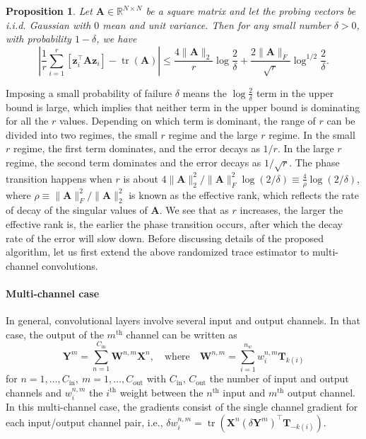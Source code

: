 \documentclass[10pt]{article}
\newcommand{\B}{\mathbf}
\newtheorem{proposition}{Proposition}
\begin{document}
\begin{proposition}
Let $\B{A} \in \mathbb{R}^{N \times N}$ be a square matrix and let the probing vectors be i.i.d. Gaussian with $0$ mean and unit variance. Then for any small number $\delta >0$, with probability $1-\delta$, we have
\[
\left| \frac{1}{r}\sum_{i=1}^r\left[\B{z}^{\top}_i \B{A} \B{z}_i\right] - \operatorname{tr}\left(\B{A}\right)\right| \leq  \frac{4\|\B{A}\|_2}{r}\log \frac{2}{\delta} + \frac{2\|\B{A}\|_F}{\sqrt r}\log^{1/2} \frac{2}{\delta}.
\]
\end{proposition}
Imposing a small probability of failure $\delta$ means the $\log\frac{2}{\delta}$ term in the upper bound is large, which implies that neither term in the upper bound is dominating for all the $r$ values. Depending on which term is dominant, the range of $r$ can be divided into two regimes, the small $r$ regime and the large $r$ regime. In the small $r$ regime, the first term dominates, and the error decays as $1/r$. In the large $r$ regime, the second term dominates and the error decays as $1/\sqrt{r}$. The phase transition happens when $r$ is about $4\|\B{A}\|^2_2/\|\B{A}\|^2_F \log (2/\delta) \equiv \frac{4}{\rho} \log (2/\delta)$, where $\rho\equiv \|\B{A}\|^2_F/\|\B{A}\|_2^2 $ is known as the effective rank, which reflects the rate of decay of the singular values of $\B{A}$. We see that as $r$ increases, the larger the effective rank is, the earlier the phase transition occurs, after which the decay rate of the error will slow down.
Before discussing details of the proposed algorithm, let us first extend the above randomized trace estimator to multi-channel convolutions.

\paragraph*{Multi-channel case}\label{multi-channel}
In general, convolutional layers involve several input and output channels. In that case, the output of the $m^\text{th}$ channel can be written as
\begin{equation}
\B{Y}^m =
\sum_{n=1}^{C_{\text{in}}} \B{W}^{n,m} \B{X}^n, \quad\text{where}\quad\B{W}^{n,m} = \sum_{i=1}^{n_w} w^{n,m}_i \B{T}_{k(i)}
\label{LAconMC}
\end{equation}
for $n=1, \ldots, C_{\text{in}},\ m=1, \ldots, C_{\text{out}}$ with $C_{\text{in}},\, C_{\text{out}}$ the number of input and output channels and $w^{n,m}_i$ the $i^{\text{th}}$ weight between the $n^{\text{th}}$ input and $m^{\text{th}}$ output channel. In this multi-channel case, the gradients consist of the single channel gradient for each input/output channel pair, i.e., $\delta w_i^{n, m} = \operatorname{tr}(\B{X}^n (\delta\B{Y}^m)^\top \B{T}_{-k(i)})$.
\end{document}
